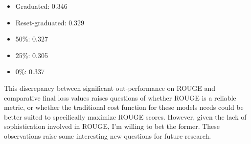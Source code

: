\begin{itemize}
\item Graduated: 0.346
\item Reset-graduated: 0.329
\item 50\%: 0.327
\item 25\%: 0.305
\item 0\%: 0.337
\end{itemize}

This discrepancy between significant out-performance on ROUGE and comparative final loss values raises questions of whether ROUGE is a reliable metric, or whether the traditional cost function for these models needs could be better suited to specifically maximize ROUGE scores. However, given the lack of sophistication involved in ROUGE, I'm willing to bet the former. These observations raise some interesting new questions for future research.